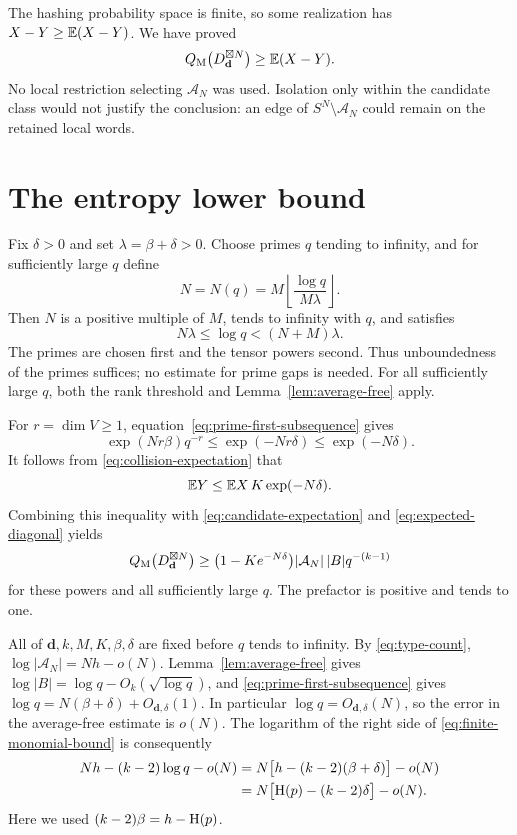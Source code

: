 The hashing probability space is finite, so some realization has
$X-Y\geq\mathbb E(X-Y)$. We have proved
\begin{equation}
 Q_{\mathrm M}\bigl(D_{\mathbf d}^{\boxtimes N}\bigr)\geq\mathbb E(X-Y).
 \label{eq:expected-diagonal}
\end{equation}
No local restriction selecting $\mathcal A_N$ was used. Isolation
only within the candidate class would not justify the conclusion:
an edge of $S^N\setminus\mathcal A_N$ could remain on the retained
local words.

\section{The entropy lower bound}
\label{sec:lower-bound}

Fix $\delta>0$ and set $\lambda=\beta+\delta>0$. Choose primes
$q$ tending to infinity, and for sufficiently large $q$ define
\[
 N=N(q)=M\left\lfloor\frac{\log q}{M\lambda}\right\rfloor.
\]
Then $N$ is a positive multiple of $M$, tends to infinity with
$q$, and satisfies
\begin{equation}
 N\lambda\leq\log q<(N+M)\lambda.
 \label{eq:prime-first-subsequence}
\end{equation}
The primes are chosen first and the tensor powers second. Thus
unboundedness of the primes suffices; no estimate for prime gaps
is needed. For all sufficiently large $q$, both the rank threshold
and Lemma~\ref{lem:average-free} apply.

For $r=\dim V\geq 1$, equation~\eqref{eq:prime-first-subsequence}
gives
\[
 \exp(Nr\beta)q^{-r}\leq\exp(-Nr\delta)
                       \leq\exp(-N\delta).
\]
It follows from \eqref{eq:collision-expectation} that
\[
 \mathbb E Y\leq\mathbb E X\,K\exp(-N\delta).
\]
Combining this inequality with \eqref{eq:candidate-expectation}
and \eqref{eq:expected-diagonal} yields
\begin{equation}
 Q_{\mathrm M}\bigl(D_{\mathbf d}^{\boxtimes N}\bigr)
 \geq\bigl(1-Ke^{-N\delta}\bigr)
        |\mathcal A_N|\,|B|q^{-(k-1)}
 \label{eq:finite-monomial-bound}
\end{equation}
for these powers and all sufficiently large $q$. The prefactor
is positive and tends to one.

All of $\mathbf d,k,M,K,\beta,\delta$ are fixed before $q$ tends
to infinity. By \eqref{eq:type-count},
$\log|\mathcal A_N|=Nh-o(N)$. Lemma~\ref{lem:average-free} gives
$\log|B|=\log q-O_k(\sqrt{\log q})$, and
\eqref{eq:prime-first-subsequence} gives
$\log q=N(\beta+\delta)+O_{\mathbf d,\delta}(1)$.
In particular $\log q=O_{\mathbf d,\delta}(N)$, so the error in
the average-free estimate is $o(N)$. The logarithm of the right
side of \eqref{eq:finite-monomial-bound} is consequently
\begin{align*}
 Nh-(k-2)\log q-o(N)
 &=N\bigl[h-(k-2)(\beta+\delta)\bigr]-o(N)\\
 &=N\bigl[\operatorname{H}(p)-(k-2)\delta\bigr]-o(N).
\end{align*}
Here we used $(k-2)\beta=h-\operatorname{H}(p)$.

